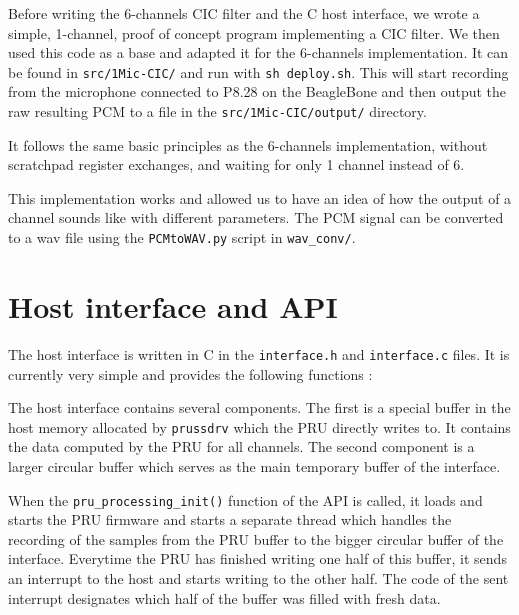 \documentclass[]{report}
\begin{document}
Before writing the 6-channels CIC filter and the C host interface, we wrote a simple, 1-channel, proof of concept program implementing a CIC filter. We then used this code as a base and adapted it for the 6-channels implementation. It can be found in \texttt{src/1Mic-CIC/} and run with \texttt{sh deploy.sh}. This will start recording from the microphone connected to P8.28 on the BeagleBone and then output the raw resulting PCM to a file in the \texttt{src/1Mic-CIC/output/} directory.

It follows the same basic principles as the 6-channels implementation, without scratchpad register exchanges, and waiting for only 1 channel instead of 6.

This implementation works and allowed us to have an idea of how the output of a channel sounds like with different parameters. The PCM signal can be converted to a wav file using the \texttt{PCMtoWAV.py} script in \texttt{wav\_conv/}.

\hypertarget{host-interface-and-api}{%
\section{Host interface and API}\label{host-interface-and-api}}

The host interface is written in C in the \texttt{interface.h} and
\texttt{interface.c} files. It is currently very simple and provides the
following functions :




The host interface contains several components. The first is a special buffer in the host memory allocated by \texttt{prussdrv} which the PRU directly writes to. It contains the data computed by the PRU for all channels. The second component is a larger circular buffer which serves as the main temporary buffer of the interface.

When the \texttt{pru\_processing\_init()} function of the API is called, it loads and starts the PRU firmware and starts a separate thread which handles the recording of the samples from the PRU buffer to the bigger circular buffer of the interface. Everytime the PRU has finished writing one half of this buffer, it sends an interrupt to the host and starts writing to the other half. The code of the sent interrupt designates which half of the buffer was filled with fresh data.
\end{document}
